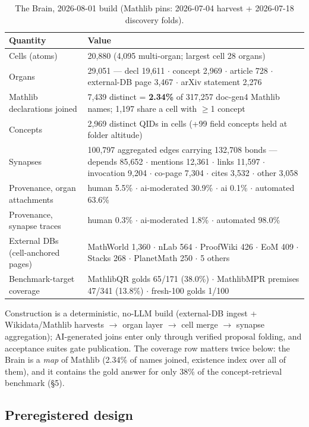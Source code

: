 \documentclass[10pt]{article}
\begin{document}
\begin{table}[ht]
\centering\footnotesize
\caption{The Brain, 2026-08-01 build (Mathlib pins: 2026-07-04 harvest +
2026-07-18 discovery folds).}
\label{tab:artifact}
\begin{tabular}{@{}p{}p{}@{}}
\toprule
Quantity & Value \\
\midrule
Cells (atoms) & 20,880 (4,095 multi-organ; largest cell 28 organs) \\
Organs & 29,051 --- decl 19,611 $\cdot$ concept 2,969 $\cdot$ article 728 $\cdot$ external-DB page 3,467 $\cdot$ arXiv statement 2,276 \\
Mathlib declarations joined & 7,439 distinct = \textbf{2.34\%} of 317,257 doc-gen4 Mathlib names; 1,197 share a cell with $\geq$1 concept \\
Concepts & 2,969 distinct QIDs in cells (+99 field concepts held at folder altitude) \\
Synapses & 100,797 aggregated edges carrying 132,708 bonds --- depends 85,652 $\cdot$ mentions 12,361 $\cdot$ links 11,597 $\cdot$ invocation 9,204 $\cdot$ co-page 7,304 $\cdot$ cites 3,532 $\cdot$ other 3,058 \\
Provenance, organ attachments & human 5.5\% $\cdot$ ai-moderated 30.9\% $\cdot$ ai 0.1\% $\cdot$ automated 63.6\% \\
Provenance, synapse traces & human 0.3\% $\cdot$ ai-moderated 1.8\% $\cdot$ automated 98.0\% \\
External DBs (cell-anchored pages) & MathWorld 1,360 $\cdot$ nLab 564 $\cdot$ ProofWiki 426 $\cdot$ EoM 409 $\cdot$ Stacks 268 $\cdot$ PlanetMath 250 $\cdot$ 5 others \\
Benchmark-target coverage & MathlibQR golds 65/171 (38.0\%) $\cdot$ MathlibMPR premises 47/341 (13.8\%) $\cdot$ fresh-100 golds 1/100 \\
\bottomrule
\end{tabular}
\end{table}

Construction is a deterministic, no-LLM build (external-DB ingest +
Wikidata/Mathlib harvests $\to$ organ layer $\to$ cell merge $\to$
synapse aggregation); AI-generated joins enter only through verified
proposal folding, and acceptance suites gate publication. The coverage
row matters twice below: the Brain is a \emph{map} of Mathlib (2.34\% of
names joined, existence index over all of them), and it contains the
gold answer for only 38\% of the concept-retrieval benchmark (\S 5).

\subsection{Preregistered design}\label{sec:prereg}
\end{document}
